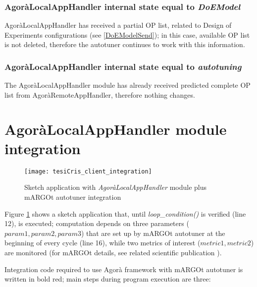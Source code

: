 \subsubsection{AgoràLocalAppHandler internal state equal to \textit{DoEModel}}

AgoràLocalAppHandler has received a partial OP list, related to Design of Experiments configurations (see \ref{DoEModelSend}); in this case, available OP list is not deleted, therefore the autotuner continues to work with this information.


\subsubsection{AgoràLocalAppHandler internal state equal to \textit{autotuning}}

The AgoràLocalAppHandler module has already received predicted complete OP list from AgoràRemoteAppHandler, therefore nothing changes.





\section{AgoràLocalAppHandler module integration}

\begin{figure}[H]

    \centering
    \texttt{[image: tesiCris\_client\_integration]}
    \caption{Sketch application with \textit{AgoràLocalAppHandler} module plus mARGOt autotuner integration}
    \label{fig::sketchApp}
    
\end{figure}

Figure \ref{fig::sketchApp} shows a sketch application that, until \textit{loop\_condition()} is verified (line 12), is executed; computation depends on three parameters ($param1, param2, param3$) that are set up by mARGOt autotuner at the beginning of every cycle (line 16), while two metrics of interest ($metric1, metric2$) are monitored (for mARGOt details, see related scientific publication \cite{gadioli2015application}).

Integration code required to use Agorà framework with mARGOt autotuner is written in bold red; main steps during program execution are three:

